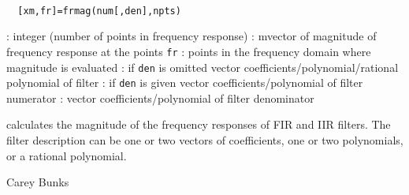 
\begin{mandesc}
   \\ %
\end{mandesc}
\begin{calling_sequence}
\begin{verbatim}
  [xm,fr]=frmag(num[,den],npts)  
\end{verbatim}
\end{calling_sequence}
\begin{parameters}
  \begin{varlist}
    : integer (number of points in frequency response)
    : mvector of magnitude of frequency response at the points \verb!fr!
    : points in the frequency domain where magnitude is evaluated
    : if \verb!den! is omitted vector coefficients/polynomial/rational polynomial of filter
    : if \verb!den! is given vector coefficients/polynomial of filter numerator
    : vector coefficients/polynomial of filter denominator
  \end{varlist}
\end{parameters}
\begin{mandescription}
  calculates the magnitude of the frequency responses of
  FIR and IIR filters. The filter description can be
  one or two vectors of coefficients, one or two polynomials,
  or a rational polynomial.
\end{mandescription}
\begin{authors}
    Carey Bunks  
\end{authors}
